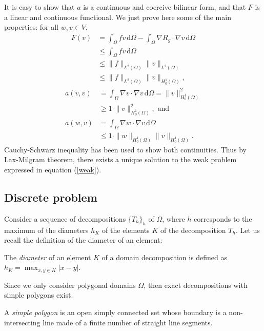 It is easy to show that $a$ is a continuous and coercive bilinear form, and that $F$ is a linear and continuous functional. We just prove here some of the main properties: for all $w,v\in V$, 
\begin{align*}
F(v) &= \int_\Omega fv \, \mathrm{d}\Omega -\int_\Omega \nabla R_g \cdot \nabla v \, \mathrm{d} \Omega \\
& \leq \int_\Omega fv \, \mathrm{d}\Omega \\
& \leq \|f\|_{L^2(\Omega)}\|v\|_{L^2(\Omega)}\\
& \leq \|f\|_{L^2(\Omega)}\|v\|_{H_0^1(\Omega)},
\end{align*}
\begin{align*}
a(v,v) &= \int_\Omega \nabla v \cdot \nabla v \, \mathrm{d} \Omega = \|v\|^2_{H_0^1(\Omega)}\\
& \geq 1\cdot \|v\|^2_{H_0^1(\Omega)}, \text{ and }\\
a(w,v) &= \int_\Omega \nabla w \cdot \nabla v \, \mathrm{d} \Omega \\
& \leq 1 \cdot \|w\|_{H_0^1(\Omega)}\|v\|_{H_0^1(\Omega)}.
\end{align*} 
Cauchy-Schwarz inequality has been used to show both continuities. Thus by Lax-Milgram theorem, there exists a unique solution to the weak problem expressed in equation (\ref{weak}). 


\subsection{Discrete problem}
Consider a sequence of decompositions $\{T_h\}_h$ of $\Omega$, where $h$ corresponds to the maximum of the diameters $h_K$ of the elements $K$ of the decomposition $T_h$. Let us recall the definition of the diameter of an element: 

\begin{definition}[Diameter]
The \textit{diameter} of an element $K$ of a domain decomposition is defined as $h_K = \max_{x,y\in K}|x-y|$. 
\end{definition}

\noindent Since we only consider polygonal domains $\Omega$, then exact decompositions with simple polygons exist. 

\begin{definition}
A \textit{simple polygon} is an open simply connected set whose boundary is a non-intersecting line made of a finite number of straight line segments. 
\end{definition}

